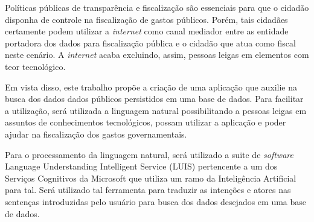 Políticas públicas de transparência e fiscalização são essenciais para que o cidadão disponha de controle na fiscalização de gastos públicos. Porém, tais cidadães certamente podem utilizar a \textit{internet} como canal mediador entre as entidade portadora dos dados para fiscalização pública e o cidadão que atua como fiscal neste cenário. A \textit{internet} acaba excluindo, assim, pessoas leigas em elementos com teor tecnológico.

Em vista disso, este trabalho propõe a criação de uma aplicação que auxilie na busca dos dados dados públicos persistidos em uma base de dados. Para facilitar a utilização, será utilizada a linguagem natural possibilitando a pessoas leigas em assuntos de conhecimentos tecnológicos, possam utilizar a aplicação e poder ajudar na fiscalização dos gastos governamentais.

Para o processamento da linguagem natural, será utilizado a suite de \textit{software} Language Understanding Intelligent Service (LUIS) pertencente a um dos Serviços Cognitivos da Microsoft que utiliza um ramo da Inteligência Artificial para tal. Será utilizado tal ferramenta para traduzir as intenções e atores nas sentenças introduzidas pelo usuário para busca dos dados desejados em uma base de dados.

